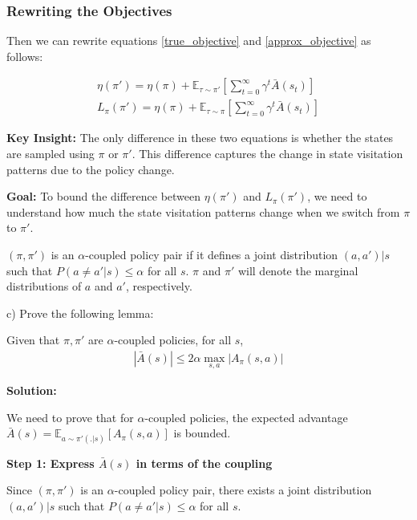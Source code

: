 \subsubsection{Rewriting the Objectives}

Then we can rewrite equations \ref{true_objective} and \ref{approx_objective} as follows:

\begin{align}
    \eta(\pi') = \eta(\pi) + \mathbb{E}_{\tau \sim \pi'}[\sum_{t = 0}^{\infty}\gamma^t \bar{A}(s_t)] \\
    L_{\pi}(\pi') = \eta(\pi) + \mathbb{E}_{\tau \sim \pi}[\sum_{t = 0}^{\infty}\gamma^t \bar{A}(s_t)] 
\end{align}

\textbf{Key Insight:}
The only difference in these two equations is whether the states are sampled using $\pi$ or $\pi'$. This difference captures the change in state visitation patterns due to the policy change.

\textbf{Goal:}
To bound the difference between $\eta(\pi')$ and $L_{\pi}(\pi')$, we need to understand how much the state visitation patterns change when we switch from $\pi$ to $\pi'$.

\begin{definition}
    $(\pi, \pi')$ is an $\alpha$-coupled policy pair if it defines a joint distribution $(a, a')|s$ such that $P(a \neq a'|s) \le \alpha$ for all $s$. $\pi$ and $\pi'$ will denote the marginal distributions of $a$ and $a'$, respectively.
\end{definition}

c) Prove the following lemma:

\begin{lemma}
    Given that $\pi, \pi'$ are $\alpha$-coupled policies, for all $s$,
    \begin{align*}
        |\bar{A}(s)| \le 2\alpha \max_{s, a}|A_{\pi}(s,a)|
    \end{align*}
\end{lemma}

\textbf{Solution:}

We need to prove that for $\alpha$-coupled policies, the expected advantage $\bar{A}(s) = \mathbb{E}_{a \sim \pi'(.|s)}[A_{\pi}(s, a)]$ is bounded.

\textbf{Step 1: Express $\bar{A}(s)$ in terms of the coupling}

Since $(\pi, \pi')$ is an $\alpha$-coupled policy pair, there exists a joint distribution $(a, a')|s$ such that $P(a \neq a'|s) \le \alpha$ for all $s$.

